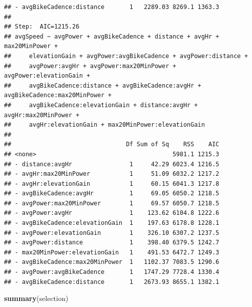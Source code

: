 \documentclass[
]{book}
\newenvironment{Shaded}{\begin{snugshade}}{\end{snugshade}}
\newcommand{\KeywordTok}[1]{\textcolor[rgb]{0.13,0.29,0.53}{\textbf{#1}}}
\newcommand{\NormalTok}[1]{#1}
\begin{document}
\begin{verbatim}
## - avgBikeCadence:distance       1   2289.03 8269.1 1363.3
## 
## Step:  AIC=1215.26
## avgSpeed ~ avgPower + avgBikeCadence + distance + avgHr + max20MinPower + 
##     elevationGain + avgPower:avgBikeCadence + avgPower:distance + 
##     avgPower:avgHr + avgPower:max20MinPower + avgPower:elevationGain + 
##     avgBikeCadence:distance + avgBikeCadence:avgHr + avgBikeCadence:max20MinPower + 
##     avgBikeCadence:elevationGain + distance:avgHr + avgHr:max20MinPower + 
##     avgHr:elevationGain + max20MinPower:elevationGain
## 
##                                Df Sum of Sq    RSS    AIC
## <none>                                      5981.1 1215.3
## - distance:avgHr                1     42.29 6023.4 1216.5
## - avgHr:max20MinPower           1     51.09 6032.2 1217.2
## - avgHr:elevationGain           1     60.15 6041.3 1217.8
## - avgBikeCadence:avgHr          1     69.05 6050.2 1218.5
## - avgPower:max20MinPower        1     69.57 6050.7 1218.5
## - avgPower:avgHr                1    123.62 6104.8 1222.6
## - avgBikeCadence:elevationGain  1    197.63 6178.8 1228.1
## - avgPower:elevationGain        1    326.10 6307.2 1237.5
## - avgPower:distance             1    398.40 6379.5 1242.7
## - max20MinPower:elevationGain   1    491.53 6472.7 1249.3
## - avgBikeCadence:max20MinPower  1   1102.37 7083.5 1290.6
## - avgPower:avgBikeCadence       1   1747.29 7728.4 1330.4
## - avgBikeCadence:distance       1   2673.93 8655.1 1382.1
\end{verbatim}

\begin{Shaded}
\begin{Highlighting}[]
\KeywordTok{summary}\NormalTok{(selection)}
\end{Highlighting}
\end{Shaded}
\end{document}
